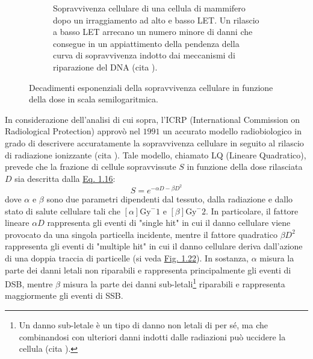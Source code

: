 \documentclass[12pt,a4paper,twoside]{report}
\begin{document}
\begin{figure}[H]
\begin{subfigure}[t]{0.49\textwidth}
			\caption{Sopravvivenza cellulare di una cellula di mammifero dopo un irraggiamento ad alto e basso LET. Un rilascio a basso LET arrecano un numero minore di danni che consegue in un appiattimento della pendenza della curva di sopravvivenza indotto dai meccanismi di riparazione del DNA (cita
				).}
			\label{fig:survival2}
		\end{subfigure}
		\caption{Decadimenti esponenziali della sopravvivenza cellulare in funzione della dose in scala semilogaritmica.}
	\end{figure}
	
	In considerazione dell'analisi di cui sopra, l'ICRP (International Commission on Radiological Protection) approvò nel $1991$ un accurato modello radiobiologico in grado di descrivere accuratamente la sopravvivenza cellulare in seguito al rilascio di radiazione ionizzante (cita
	). Tale modello, chiamato LQ (Lineare Quadratico), prevede che la frazione di cellule sopravvissute $S$ in funzione della dose rilasciata $D$ sia descritta dalla \hyperref[eq:survival2]{Eq. 1.16}:
	\begin{equation}
		S=e^{-\alpha D-\beta D^2}
		\label{eq:survival2}
	\end{equation}
	dove $\alpha$ e $\beta$ sono due parametri dipendenti dal tessuto, dalla radiazione e dallo stato di salute cellulare tali che $\left[\alpha\right]\mbox{Gy}^-1$ e $\left[\beta\right]\mbox{Gy}^-2$. In particolare, il fattore lineare $\alpha D$ rappresenta gli eventi di "single hit" in cui il danno cellulare viene provocato da una singola particella incidente, mentre il fattore quadratico $\beta D^2$ rappresenta gli eventi di "multiple hit" in cui il danno cellulare deriva dall'azione di una doppia traccia di particelle (si veda \hyperref[fig:survival_cell]{Fig. 1.22}). In sostanza, $\alpha$ misura la parte dei danni letali non riparabili e rappresenta principalmente gli eventi di DSB, mentre $\beta$ misura la parte dei danni sub-letali\footnote{Un danno sub-letale è un tipo di danno non letali di per sé, ma che combinandosi con ulteriori danni indotti dalle radiazioni può uccidere la cellula (cita
		).} riparabili e rappresenta maggiormente gli eventi di SSB.
	
\end{document}
